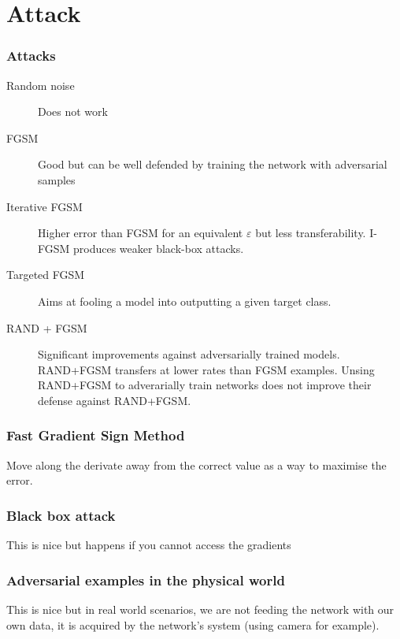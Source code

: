 \documentclass[9pt]{beamer}
\begin{document}
\section{Attack}

\begin{frame}
  \frametitle{Attacks}

  \begin{description}
  \item[Random noise] Does not work
  \item[FGSM] Good but can be well defended by training the network
    with adversarial samples
  \item[Iterative FGSM] Higher error than FGSM for an equivalent
    $\varepsilon$ but less transferability. I-FGSM produces weaker
    black-box attacks.
  \item[Targeted FGSM] Aims at fooling a model into outputting a given
    target class.
  \item[RAND + FGSM] Significant improvements against adversarially
    trained models. RAND+FGSM transfers at lower rates than FGSM
    examples. Unsing RAND+FGSM to adverarially train networks does not
    improve their defense against RAND+FGSM.
  \end{description}
\end{frame}

\begin{frame}
  \frametitle{Fast Gradient Sign Method}

  Move along the derivate away from the correct value as a way to
  maximise the error.
\end{frame}

\begin{frame}
  \frametitle{Black box attack}

  This is nice but happens if you cannot access the gradients

\end{frame}

\begin{frame}
  \frametitle{Adversarial examples in the physical world}

  This is nice but in real world scenarios, we are not feeding the
  network with our own data, it is acquired by the network's system
  (using camera for example).

\end{frame}
\end{document}
